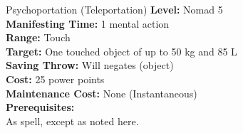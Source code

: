 {Psychoportation (Teleportation)}
{
	\textbf{Level:}
	Nomad 5\\
	\textbf{Manifesting Time:}
	1 mental action\\
	\textbf{Range:}
	Touch\\
	\textbf{Target:}
	One touched object of up to 50 kg and 85 L\\
	\textbf{Saving Throw:}
	Will negates (object)\\
	\textbf{Cost:}
	25 power points\\
	\textbf{Maintenance Cost:}
	None (Instantaneous)\\
	\textbf{Prerequisites:}
	\\
}
{
	As  spell, except as noted here.
}
